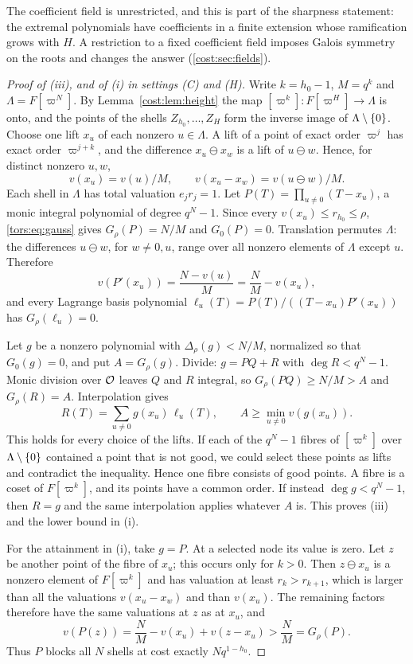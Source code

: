 The coefficient field is unrestricted, and this is part of the sharpness statement: the
extremal polynomials have coefficients in a finite extension whose ramification grows with
$H$. A restriction to a fixed coefficient field imposes Galois symmetry on the roots and
changes the answer (\cref{cost:sec:fields}).

\begin{proof}[Proof of \textup{(iii)}, and of \textup{(i)} in settings \textup{(C)} and \textup{(H)}]
Write $k=h_0-1$, $M=q^k$ and $\Lambda=F[\varpi^N]$. By Lemma~\ref{cost:lem:height} the map
$[\varpi^k]\colon F[\varpi^H]\to\Lambda$ is onto, and the points of the shells
$Z_{h_0},\ldots,Z_H$ form the inverse image of $\Lambda\setminus\{0\}$. Choose one lift $x_u$
of each nonzero $u\in\Lambda$. A lift of a point of exact order $\varpi^j$ has exact order
$\varpi^{j+k}$, and the difference $x_u\ominus x_w$ is a lift of $u\ominus w$. Hence, for
distinct nonzero $u,w$,
\[
 v(x_u)=v(u)/M,\qquad v(x_u-x_w)=v(u\ominus w)/M.
\]
Each shell in $\Lambda$ has total valuation $e_jr_j=1$. Let $P(T)=\prod_{u\ne0}(T-x_u)$,
a monic integral polynomial of degree $q^N-1$. Since every $v(x_u)\le r_{h_0}\le\rho$,
\eqref{tors:eq:gauss} gives $G_\rho(P)=N/M$ and $G_0(P)=0$. Translation permutes $\Lambda$:
the differences $u\ominus w$, for $w\ne0,u$, range over all nonzero elements of $\Lambda$
except $u$. Therefore
\[
 v(P'(x_u))=\frac{N-v(u)}M=\frac NM-v(x_u),
\]
and every Lagrange basis polynomial $\ell_u(T)=P(T)/((T-x_u)P'(x_u))$ has $G_\rho(\ell_u)=0$.

Let $g$ be a nonzero polynomial with $\Delta_\rho(g)<N/M$, normalized so that $G_0(g)=0$,
and put $A=G_\rho(g)$. Divide: $g=PQ+R$ with $\deg R<q^N-1$. Monic division over $\mathcal{O}$
leaves $Q$ and $R$ integral, so $G_\rho(PQ)\ge N/M>A$ and $G_\rho(R)=A$. Interpolation gives
\[
 R(T)=\sum_{u\ne0}g(x_u)\,\ell_u(T),\qquad A\ge\min_{u\ne0}v(g(x_u)).
\]
This holds for every choice of the lifts. If each of the $q^N-1$ fibres of $[\varpi^k]$ over
$\Lambda\setminus\{0\}$ contained a point that is not good, we could select these points as
lifts and contradict the inequality. Hence one fibre consists of good points. A fibre is a
coset of $F[\varpi^k]$, and its points have a common order. If instead $\deg g<q^N-1$, then
$R=g$ and the same interpolation applies whatever $A$ is. This proves (iii) and the lower
bound in (i).

For the attainment in (i), take $g=P$. At a selected node its value is zero. Let $z$ be
another point of the fibre of $x_u$; this occurs only for $k>0$. Then $z\ominus x_u$ is a
nonzero element of $F[\varpi^k]$ and has valuation at least $r_k>r_{k+1}$, which is larger
than all the valuations $v(x_u-x_w)$ and than $v(x_u)$. The remaining factors therefore
have the same valuations at $z$ as at $x_u$, and
\[
 v(P(z))=\frac NM-v(x_u)+v(z-x_u)>\frac NM=G_\rho(P).
\]
Thus $P$ blocks all $N$ shells at cost exactly $Nq^{1-h_0}$.
\end{proof}

